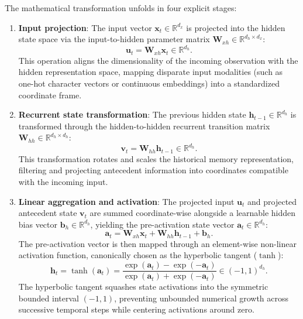 \documentclass[../../main.tex]{subfiles}
\begin{document}
The mathematical transformation unfolds in four explicit stages:
\begin{enumerate}
    \item \textbf{Input projection}: The input vector $\mathbf{x}_t \in \mathbb{R}^{d_x}$ is projected into the hidden state space via the input-to-hidden parameter matrix $\mathbf{W}_{xh} \in \mathbb{R}^{d_h \times d_x}$:
    \begin{equation}
    \mathbf{u}_t = \mathbf{W}_{xh} \mathbf{x}_t \in \mathbb{R}^{d_h}.
    \end{equation}
    This operation aligns the dimensionality of the incoming observation with the hidden representation space, mapping disparate input modalities (such as one-hot character vectors or continuous embeddings) into a standardized coordinate frame.
    
    \item \textbf{Recurrent state transformation}: The previous hidden state $\mathbf{h}_{t-1} \in \mathbb{R}^{d_h}$ is transformed through the hidden-to-hidden recurrent transition matrix $\mathbf{W}_{hh} \in \mathbb{R}^{d_h \times d_h}$:
    \begin{equation}
    \mathbf{v}_t = \mathbf{W}_{hh} \mathbf{h}_{t-1} \in \mathbb{R}^{d_h}.
    \end{equation}
    This transformation rotates and scales the historical memory representation, filtering and projecting antecedent information into coordinates compatible with the incoming input.
    
    \item \textbf{Linear aggregation and activation}: The projected input $\mathbf{u}_t$ and projected antecedent state $\mathbf{v}_t$ are summed coordinate-wise alongside a learnable hidden bias vector $\mathbf{b}_h \in \mathbb{R}^{d_h}$, yielding the pre-activation state vector $\mathbf{a}_t \in \mathbb{R}^{d_h}$:
    \begin{equation}
    \mathbf{a}_t = \mathbf{W}_{xh} \mathbf{x}_t + \mathbf{W}_{hh} \mathbf{h}_{t-1} + \mathbf{b}_h.
    \label{eq:rnn_preactivation}
    \end{equation}
    The pre-activation vector is then mapped through an element-wise non-linear activation function, canonically chosen as the hyperbolic tangent ($\tanh$):
    \begin{equation}
    \mathbf{h}_t = \tanh\left(\mathbf{a}_t\right) = \frac{\exp\left(\mathbf{a}_t\right) - \exp\left(-\mathbf{a}_t\right)}{\exp\left(\mathbf{a}_t\right) + \exp\left(-\mathbf{a}_t\right)} \in (-1, 1)^{d_h}.
    \label{eq:rnn_hidden_state}
    \end{equation}
    The hyperbolic tangent squashes state activations into the symmetric bounded interval $(-1, 1)$, preventing unbounded numerical growth across successive temporal steps while centering activations around zero.
    

\end{enumerate}
\end{document}

